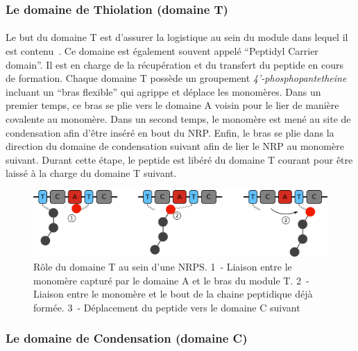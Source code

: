 \documentclass[12pt,french,twoside]{report}
\begin{document}
\subsubsection{Le domaine de Thiolation (domaine T)}

\paragraph{}Le but du domaine T est d'assurer la logistique au sein du module dans lequel il est contenu~\cite{stachelhaus_biochemical_1996,calcott_portability_2015}.
Ce domaine est également souvent appelé ``Peptidyl Carrier domain''.
Il est en charge de la récupération et du transfert du peptide en cours de formation.
Chaque domaine T possède un groupement \textit{4’-phosphopantetheine} incluant un ``bras flexible'' qui agrippe et déplace les monomères.
Dans un premier temps, ce bras se plie vers le domaine A voisin pour le lier de manière covalente au monomère.
Dans un second temps, le monomère est mené au site de condensation afin d'être inséré en bout du NRP.
Enfin, le bras se plie dans la direction du domaine de condensation suivant afin de lier le NRP au monomère suivant.
Durant cette étape, le peptide est libéré du domaine T courant pour être laissé à la charge du domaine T suivant.

\begin{figure}[h!]
  \begin{center}
    \includegraphics[width=450px]{Figures/bio/Intro/T-domain.png}
    \caption{\label{T_domain}Rôle du domaine T au sein d'une NRPS.
    1~- Liaison entre le monomère capturé par le domaine A et le bras du module T.
    2~- Liaison entre le monomère et le bout de la chaine peptidique déjà formée.
    3~- Déplacement du peptide vers le domaine C suivant}
  \end{center}
\end{figure}

\subsubsection{Le domaine de Condensation (domaine C)}
\end{document}
